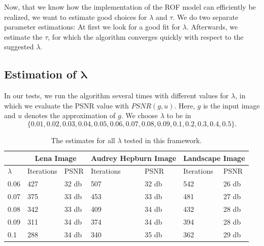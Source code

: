 \documentclass[abstracton]{scrreprt}
\begin{document}
                Now, that we know how the implementation of the ROF model can efficiently be realized, we want to estimate good choices for $\lambda$ and $\tau$. We do two separate parameter estimations: At first we look for a good fit for $\lambda$. Afterwards, we estimate the $\tau$, for which the algorithm converges quickly with respect to the suggested $\lambda$.

        \subsection{Estimation of $\boldsymbol{\lambda}$}
        \label{sub:estimation_of_lambda_rof}

            In our tests, we run the algorithm several times with different values for $\lambda$, in which we evaluate the PSNR value with $PSNR(g, u)$. Here, $g$ is the input image and $u$ denotes the approximation of $g$. We choose $\lambda$ to be in
                $$
                    \{ 0.01, 0.02, 0.03, 0.04, 0.05, 0.06, 0.07, 0.08, 0.09, 0.1, 0.2, 0.3, 0.4, 0.5 \}.
                $$
            \begin{table}[!ht]
                \centering
                \begin{tabular}{| l | l | l | l | l | l | l |}
                    \hline
                    & \multicolumn{2}{|c|}{Lena Image} & \multicolumn{2}{|c|}{Audrey Hepburn Image} & \multicolumn{2}{|c|}{Landscape Image} \\ \hline\hline 
                    $\lambda$ & Iterations & PSNR & Iterations & PSNR & Iterations & PSNR \\ \hline\hline
                    0.06 & 427 & 32 db & 507 & 32 db & 542 & 26 db \\ \hline
                    0.07 & 375 & 33 db & 453 & 33 db & 481 & 27 db \\ \hline
                    0.08 & 342 & 33 db & 409 & 34 db & 432 & 28 db \\ \hline
                    0.09 & 311 & 34 db & 374 & 34 db & 394 & 28 db \\ \hline
                    0.1 & 288 & 34 db & 340 & 35 db & 362 & 29 db \\ \hline
                \end{tabular}
                \caption[Overview of values for $\lambda$ in the ROF model.]{The estimates for all $\lambda$ tested in this framework.}
                \label{tab:estimation_of_lambda_rof}
            \end{table}
\end{document}
